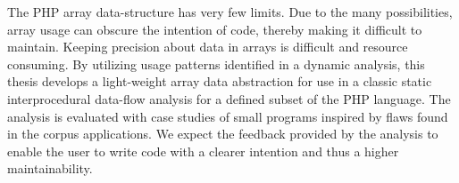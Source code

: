 
The PHP array data-structure has very few limits. Due to the many possibilities, array usage can obscure the intention of code, thereby making it difficult to maintain. Keeping precision about data in arrays is difficult and resource consuming. By utilizing usage patterns identified in a dynamic analysis, this thesis develops a light-weight array data abstraction for use in a classic static interprocedural data-flow analysis for a defined subset of the PHP language. The analysis is evaluated with case studies of small programs inspired by flaws found in the corpus applications. We expect the feedback provided by the analysis to enable the user to write code with a clearer intention and thus a higher maintainability.

\begin{comment}
Writing code with a clear intention and high maintainability is important for any development project. For the PHP language the many possibilities of the array data-structure can easily hinder those important properties. Even if PHP arrays have endless possible use cases, does the practical uses not exhibit detectable patterns? This thesis aims to answer that question with a dynamical analysis of a corpus of popular PHP applications. Using the patterns identified in the dynamical analysis a data abstraction is developed for use in a classical static interprocedural data-flow analysis for a defined subset of the PHP language. The analysis is evaluated with case studies of small programs inspired by flaws found in the corpus applications. The case studies show how the analysis can provide feedback for the user when code is produced that might hinder the clarity of intention or maintainability.
\end{comment}